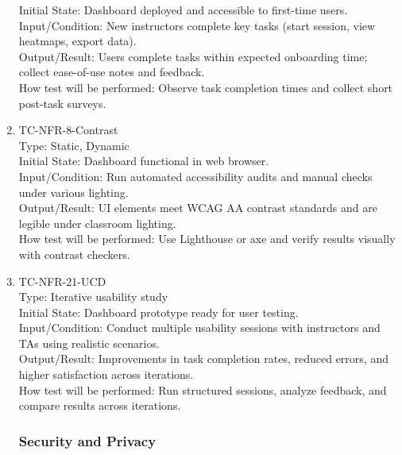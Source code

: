 \documentclass[12pt, titlepage]{article}
\begin{document}
\begin{enumerate}
Initial State: Dashboard deployed and accessible to first-time users.\\

Input/Condition: New instructors complete key tasks (start session, view heatmaps, export data).\\

Output/Result: Users complete tasks within expected onboarding time; collect ease-of-use notes and feedback.\\

How test will be performed: Observe task completion times and collect short post-task surveys.

\item{TC-NFR-8-Contrast\\}
Type: Static, Dynamic\\

Initial State: Dashboard functional in web browser.\\

Input/Condition: Run automated accessibility audits and manual checks under various lighting.\\

Output/Result: UI elements meet WCAG AA contrast standards and are legible under classroom lighting.\\

How test will be performed: Use Lighthouse or axe and verify results visually with contrast checkers.

\item{TC-NFR-21-UCD\\}
Type: Iterative usability study\\

Initial State: Dashboard prototype ready for user testing.\\

Input/Condition: Conduct multiple usability sessions with instructors and TAs using realistic scenarios.\\

Output/Result: Improvements in task completion rates, reduced errors, and higher satisfaction across iterations.\\

How test will be performed: Run structured sessions, analyze feedback, and compare results across iterations.

\subsubsection{Security and Privacy}


\end{enumerate}
\end{document}
